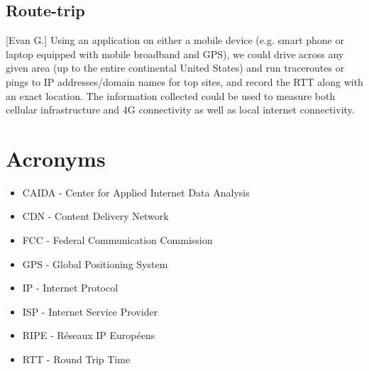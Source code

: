 \documentclass[12pt]{article}
\begin{document}
\subsection{Route-trip}[Evan G.]
Using an application on either a mobile device (e.g. smart phone or laptop equipped with mobile broadband and GPS), we could drive across any given area (up to the entire continental United States) and run traceroutes or pings to IP addresses/domain names for top sites, and record the RTT along with an exact location. The information collected could be used to measure both cellular infrastructure and 4G connectivity as well as local internet connectivity.

\newpage
\section{Acronyms}
\begin{itemize}
    \item CAIDA - Center for Applied Internet Data Analysis
    \item CDN - Content Delivery Network
    \item FCC - Federal Communication Commission
    \item GPS - Global Positioning System
    \item IP  - Internet Protocol
    \item ISP - Internet Service Provider
    \item RIPE - R\'eseaux IP Europ\'eens
    \item RTT - Round Trip Time
\end{itemize}

\newpage
\singlespacing


\end{document}

